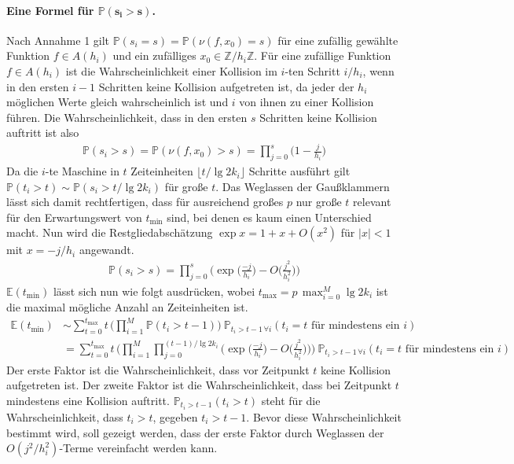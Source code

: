 \documentclass[a4paper, 10pt, ngerman]{article}
\newcommand{\E}{\mathbb{E}}
\newcommand{\Z}{\mathbb{Z}}
\renewcommand{\P}{\mathbb{P}}
\begin{document}
\paragraph{Eine Formel für $\pmb{\P(s_i > s)}$.} \space \space Nach Annahme 1 gilt $\P(s_i = s) = \P(\nu(f, x_0) = s)$ für eine zufällig gewählte Funktion $f \in A(h_i)$ und ein zufälliges $x_0 \in \Z/h_i\Z$. Für eine zufällige Funktion $f \in A(h_i)$ ist die Wahrscheinlichkeit einer Kollision im $i$-ten Schritt $i/h_i$, wenn in den ersten $i-1$ Schritten keine Kollision aufgetreten ist, da jeder der $h_i$ möglichen Werte gleich wahrscheinlich ist und $i$ von ihnen zu einer Kollision führen. Die Wahrscheinlichkeit, dass in den ersten $s$ Schritten keine Kollision auftritt ist also
\begin{align*}
    \P(s_i > s) = \P(\nu(f, x_0) > s) = \prod_{j = 0}^s \bigg (1 - \frac {j} {h_i} \bigg )
\end{align*}
Da die $i$-te Maschine in $t$ Zeiteinheiten $\lfloor t / \lg 2k_i \rfloor$ Schritte ausführt gilt $\P(t_i > t) \sim \P(s_i > t / \lg 2k_i)$ für große $t$. Das Weglassen der Gaußklammern lässt sich damit rechtfertigen, dass für ausreichend großes $p$ nur große $t$ relevant für den Erwartungswert von $t_{\min}$ sind, bei denen es kaum einen Unterschied macht. Nun wird die Restgliedabschätzung $\exp x = 1 + x + O(x^2)$ für $|x| < 1$ mit $x = -j/h_i$ angewandt.
\begin{align*}
    \P(s_i > s) = \prod_{j = 0}^{s} \Bigg ( \exp \bigg ( \frac {-j}{h_i} \bigg ) - O \bigg ( \frac {j^2} {h_i^2} \bigg ) \Bigg )
\end{align*}
$\E(t_{\min})$ lässt sich nun wie folgt ausdrücken, wobei $t_{\max} = p \, \max_{i = 0}^M \lg 2k_i$ ist die maximal mögliche Anzahl an Zeiteinheiten ist.
\begin{align*}
    \E(t_{\min})
     & \sim \sum_{t = 0}^{t_{\max}} t \, \Bigg ( \prod_{i = 1}^M \P(t_i > t - 1) \Bigg ) \ \P_{t_i > t - 1 \, \forall i}(t_i = t \text{ für mindestens ein } i)                                                                                                           \\
     & = \sum_{t = 0}^{t_{\max}} t \, \Bigg ( \prod_{i = 1}^M \prod_{j = 0}^{(t-1) / \lg 2k_i} \Bigg ( \exp \bigg ( \frac {-j}{h_i} \bigg ) - O \bigg ( \frac {j^2} {h_i^2} \bigg ) \Bigg )\Bigg ) \ \P_{t_i > t - 1 \, \forall i}(t_i = t \text{ für mindestens ein } i)
\end{align*}
Der erste Faktor ist die Wahrscheinlichkeit, dass vor Zeitpunkt $t$ keine Kollision aufgetreten ist. Der zweite Faktor ist die Wahrscheinlichkeit, dass bei Zeitpunkt $t$ mindestens eine Kollision auftritt. $\P_{t_i > t - 1}(t_i > t)$ steht für die Wahrscheinlichkeit, dass $t_i > t$, gegeben $t_i > t - 1$. Bevor diese Wahrscheinlichkeit bestimmt wird, soll gezeigt werden, dass der erste Faktor durch Weglassen der $O(j^2/h_i^2)$-Terme vereinfacht werden kann.
\end{document}
